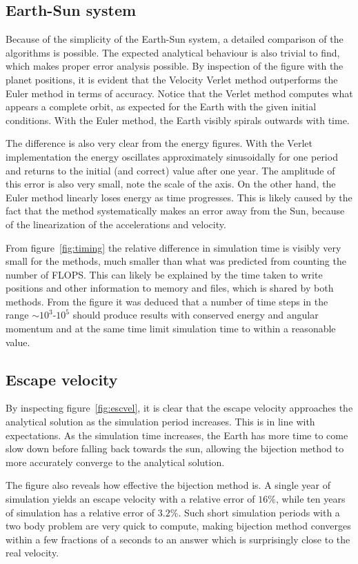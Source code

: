 \documentclass[aps,reprint]{revtex4-1}
\begin{document}
\subsection{Earth-Sun system}
Because of the simplicity of the Earth-Sun system, a detailed comparison of the
algorithms is possible. The expected analytical behaviour is also trivial to
find, which makes proper error analysis possible. By inspection of the figure with the
planet positions, it is evident that the Velocity Verlet method outperforms
the Euler method in terms of accuracy. Notice that the Verlet method computes what
appears a complete orbit, as expected for the Earth with the given initial conditions.
With the Euler method, the Earth visibly spirals outwards with time.

The difference is also very clear from the energy figures. With the Verlet
implementation the energy oscillates approximately sinusoidally for one period
and returns to the initial (and correct) value after one year. The amplitude of
this error is also very small, note the scale of the axis.
On the other hand, the Euler method linearly loses energy as time progresses. This
is likely caused by the fact that the method systematically makes an error away
from the Sun, because of the linearization of the accelerations and velocity.

From figure~\ref{fig:timing} the relative difference in simulation time is visibly
very small for the methods, much smaller than what was predicted from counting
the number of FLOPS. This can likely be explained by the time taken to write
positions and other information to memory and files, which is shared by both methods.
From the figure it was
deduced that a number of time steps in the range $\sim 10^3$-$10^5$ should produce
results with conserved energy and angular momentum and at the same time limit
simulation time to within a reasonable value.

\subsection{Escape velocity}
By inspecting figure~\ref{fig:escvel}, it is clear that the escape velocity
approaches the analytical solution as the simulation period increases. This is
in line with expectations. As the simulation time increases, the Earth has more
time to come slow down before falling back towards the sun, allowing the
bijection method to more accurately converge to the analytical solution.

The figure also reveals how effective the bijection method is. A single year of
simulation yields an escape velocity with a relative error of \(16\%\), while
ten years of simulation has a relative error of \(3.2\%\). Such short simulation
periods with a two body problem are very quick to compute, making bijection
method converges within a few fractions of a seconds to an answer which is
surprisingly close to the real velocity.
\end{document}
